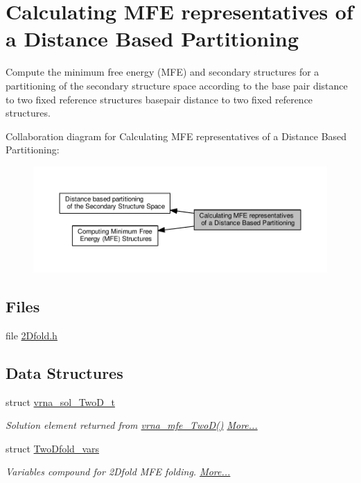 \hypertarget{group__kl__neighborhood__mfe}{}\section{Calculating M\+F\+E representatives of a Distance Based Partitioning}
\label{group__kl__neighborhood__mfe}


Compute the minimum free energy (M\+F\+E) and secondary structures for a partitioning of the secondary structure space according to the base pair distance to two fixed reference structures basepair distance to two fixed reference structures.  


Collaboration diagram for Calculating M\+F\+E representatives of a Distance Based Partitioning\+:
\nopagebreak
\begin{figure}[H]
\begin{center}
\leavevmode
\includegraphics[width=350pt]{group__kl__neighborhood__mfe}
\end{center}
\end{figure}
\subsection*{Files}
\begin{DoxyCompactItemize}
\item 
file \hyperlink{2Dfold_8h}{2\+Dfold.\+h}
\end{DoxyCompactItemize}
\subsection*{Data Structures}
\begin{DoxyCompactItemize}
\item 
struct \hyperlink{group__kl__neighborhood__mfe_structvrna__sol__TwoD__t}{vrna\+\_\+sol\+\_\+\+Two\+D\+\_\+t}
\begin{DoxyCompactList}\small\item\em Solution element returned from \hyperlink{group__kl__neighborhood__mfe_ga243c288b463147352829df04de6a2f77}{vrna\+\_\+mfe\+\_\+\+Two\+D()}  \hyperlink{group__kl__neighborhood__mfe_structvrna__sol__TwoD__t}{More...}\end{DoxyCompactList}\item 
struct \hyperlink{group__kl__neighborhood__mfe_structTwoDfold__vars}{Two\+Dfold\+\_\+vars}
\begin{DoxyCompactList}\small\item\em Variables compound for 2\+Dfold M\+F\+E folding.  \hyperlink{group__kl__neighborhood__mfe_structTwoDfold__vars}{More...}\end{DoxyCompactList}\end{DoxyCompactItemize}
